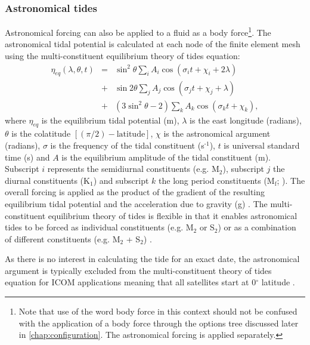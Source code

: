 \subsubsection{Astronomical tides}\label{sec:AST}
\label{astronomical}

Astronomical forcing can also be applied to a fluid as a body force\footnote{Note that use of the word body force in this context should not be confused with the application of a body force through the options tree discussed later in \ref{chap:configuration}. The astronomical forcing is applied separately.}. 
The astronomical tidal potential is calculated at each node of the finite element mesh using the 
multi-constituent equilibrium theory of tides equation:
  \begin{eqnarray}
\eta_{eq}\left(\lambda,\theta,t\right)&=&\sin^{2}\theta\sum_{i}A_{i}\cos\left(\sigma_{i}t+\chi_{i}+2\lambda\right)\nonumber\\
&+&\sin2\theta\sum_{j}A_{j}\cos\left(\sigma_{j}t+\chi_{j}+\lambda\right)\\
&+&\left(3\sin^{2}\theta-2\right)\sum_{k}A_{k}\cos\left(\sigma_{k}t+\chi_{k}\right)\nonumber,
\label{eq:multi-constituent-eq_theory}
  \end{eqnarray}
where $\eta_{eq}$ is the equilibrium tidal potential (m), $\lambda$ is the east longitude (radians), $\theta$ is the colatitude
$[(\pi/2)-{\text{latitude}}]$, $\chi$ is the astronomical argument (radians), $\sigma$
is the frequency of the tidal constituent (s$^{\text{-1}}$), $t$ is universal standard
time (s) and $A$ is the equilibrium amplitude of the tidal constituent (m). Subscript
$i$ represents the semidiurnal constituents (e.g. M$_{\text{2}}$), subscript $j$
the diurnal constituents (\eg K$_{\text{1}}$) and subscript $k$ the long period
constituents (\eg M$_{\text{f}}$; \citealp{Wells2008}).   
The overall forcing 
is applied as the product of the gradient of the resulting equilibrium tidal potential and the acceleration due 
to gravity (g) \citep{Mellor1996, Kantha2000, Wells2007}.
The multi-constituent equilibrium theory of tides is flexible in that it enables astronomical tides to be forced as 
individual constituents 
(e.g. M$_{2}$ or S$_{2}$) or as a combination of different constituents (e.g. M$_{2}$ + S$_{2}$) \citep{Wells2008}.

As there is no interest in calculating the tide for an exact date, the astronomical argument 
is typically excluded from the multi-constituent theory of tides equation for ICOM applications meaning that all satellites 
start at 0$^{\circ}$ latitude \citep{Wells2008}.

